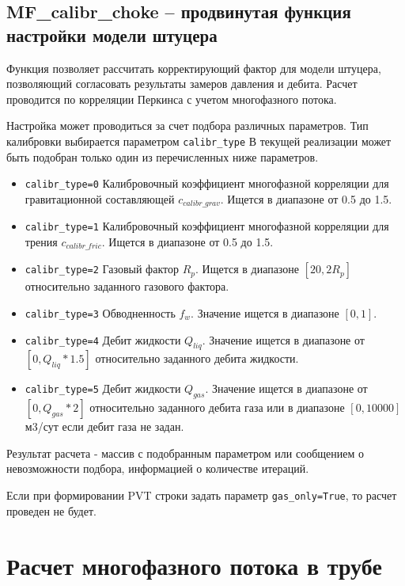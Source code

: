 \subsection{MF\_calibr\_choke – продвинутая функция настройки модели штуцера}
Функция позволяет рассчитать корректирующий фактор для модели штуцера, позволяющий согласовать результаты замеров давления и дебита. Расчет проводится по корреляции Перкинса \cite{Perkins_1993} с учетом многофазного потока.  

Настройка может проводиться за счет подбора различных параметров. Тип калибровки выбирается параметром \texttt{calibr_type} В текущей реализации может быть подобран только один из перечисленных ниже параметров.

\begin{itemize}
	\item \texttt{calibr_type=0} Калибровочный коэффициент многофазной корреляции для гравитационной составляющей  $c_{calibr\_grav}$. Ищется в диапазоне от 0.5 до 1.5.
	\item \texttt{calibr_type=1} Калибровочный коэффициент многофазной корреляции для трения $c_{calibr\_fric}$. Ищется в диапазоне от 0.5 до 1.5.
	\item \texttt{calibr_type=2} Газовый фактор $R_p$. Ищется в диапазоне $[20, 2 R_p]$ относительно заданного газового фактора. 
	\item \texttt{calibr_type=3} Обводненность $f_w$.  Значение ищется в диапазоне $[0, 1]$.  
	\item \texttt{calibr_type=4} Дебит жидкости \(Q_{liq}\). Значение ищется в диапазоне от \([0, Q_{liq}*1.5]\) относительно заданного дебита жидкости. 	 
	\item \texttt{calibr_type=5} Дебит жидкости \(Q_{gas}\). Значение ищется  в диапазоне от \([0, Q_{gas}*2]\) относительно заданного дебита газа или в диапазоне \([0,10000]\) м3/сут если дебит газа не задан. 	
\end{itemize}

Результат расчета - массив с подобранным параметром или сообщением о невозможности подбора, информацией о количестве итераций. 


Если при формировании PVT строки задать параметр \texttt{gas_only=True}, то расчет проведен не будет.

\newpage
\section{Расчет многофазного потока в трубе}

